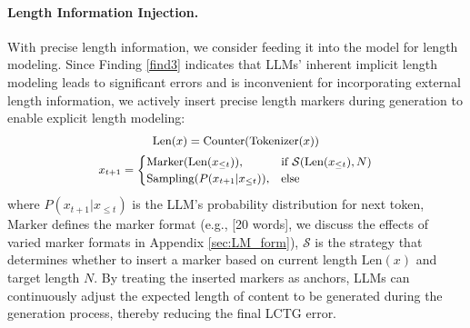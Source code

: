 \paragraph{Length Information Injection.}
With precise length information, we consider feeding it into the model for length modeling. 
Since Finding \ref{find3} indicates that LLMs' inherent implicit length modeling leads to significant errors and is inconvenient for incorporating external length information, we actively insert precise length markers during generation to enable explicit length modeling:
\begin{equation}
\small
\begin{gathered}
    \text{Len}(x) = \text{Counter}(\text{Tokenizer}(x))\\
    x_{t+1} = \begin{cases}
        \text{Marker}(\text{Len}(x_{\leq t})),
         & \text{if} \  \mathcal{S}(\text{Len}(x_{\leq t}),N)   \\
         \text{Sampling}(P(x_{t+1} | x_{\leq t})),
        & \text{else}
    \end{cases}
\end{gathered}
\end{equation}
where $P(x_{t+1} | x_{\leq t})$ is the LLM's probability distribution for next token, $\text{Marker}$ defines the marker format (e.g., [20 words], we discuss the effects of varied marker formats in Appendix \ref{sec:LM_form}), $\mathcal{S}$ is the strategy that determines whether to insert a marker based on current length $\text{Len}(x)$ and target length $N$.
By treating the inserted markers as anchors, LLMs can continuously adjust the expected length of content  to be generated during the generation process, thereby reducing the final LCTG error.


